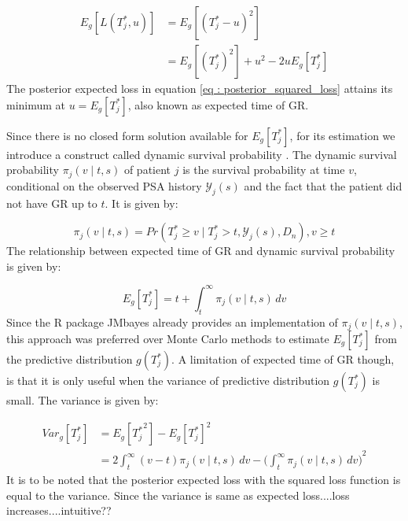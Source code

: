\begin{equation}
\label{eq : posterior_squared_loss}
\begin{split}
E_g[L(T^*_j, u)] &= E_g[(T^*_j - u)^2]\\
&=E_g[(T^*_j)^2] + u^2 -2uE_g[T^*_j]
\end{split}
\end{equation}
The posterior expected loss in equation \ref{eq : posterior_squared_loss} attains its minimum at $u = E_g[T^*_j]$, also known as expected time of GR.

Since there is no closed form solution available for $E_g[T^*_j]$, for its estimation we introduce a construct called dynamic survival probability \citep{rizopoulos2011dynamic}. The dynamic survival probability $\pi_j(v \mid t, s)$ of patient $j$ is the survival probability at time $v$, conditional on the observed PSA history $\mathcal{Y}_j(s)$ and the fact that the patient did not have GR up to $t$. It is given by:

\begin{equation}
\pi_j(v \mid t, s) = Pr(T^*_j \geq v \mid  T^*_j >t, \mathcal{Y}_j(s), D_n), v \geq t
\end{equation}
The relationship between expected time of GR and dynamic survival probability is given by:

\begin{equation*}
E_g[T^*_j] = t + \int_t^\infty \pi_j(v \mid t, s) \,dv
\end{equation*}
Since the R package JMbayes already provides an implementation of $\pi_j(v \mid t, s)$, this approach was preferred over Monte Carlo methods to estimate $E_g[T^*_j]$ from the predictive distribution $g(T^*_j)$. A limitation of expected time of GR though, is that it is only useful when the variance of predictive distribution $g(T^*_j)$ is small. The variance is given by:

\begin{equation}
\begin{split}
Var_g[T^*_j] &= E_g[{T^*_j}^2] - {E_g[T^*_j]}^2\\
&= 2 \int_t^\infty {(v-t) \pi_j(v \mid t, s) \,dv} - {\bigg(\int_t^\infty \pi_j(v \mid t, s) \,dv\bigg)}^2
\end{split}
\end{equation}
It is to be noted that the posterior expected loss with the squared loss function is equal to the variance. Since the variance is same as expected loss....loss increases....intuitive??

